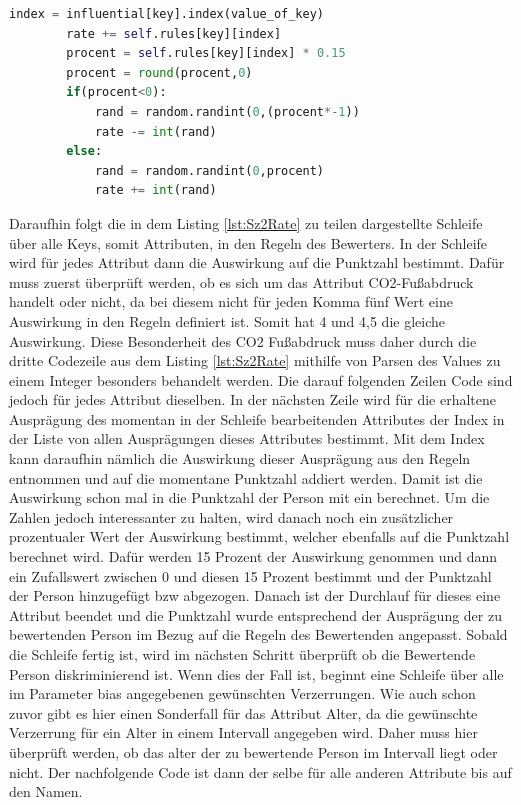 \begin{onehalfspace}
\begin{lstlisting}[language=Python,label={lst:Sz2Rate},caption=Codeausschnitt der Funktion zum Bewerten von Personen]
        index = influential[key].index(value_of_key)
        rate += self.rules[key][index]
        procent = self.rules[key][index] * 0.15
        procent = round(procent,0)
        if(procent<0):
            rand = random.randint(0,(procent*-1))
            rate -= int(rand)
        else:
            rand = random.randint(0,procent)
            rate += int(rand)
\end{lstlisting}
Daraufhin folgt die in dem Listing \ref{lst:Sz2Rate} zu teilen dargestellte Schleife über alle Keys, somit Attributen, in den Regeln des Bewerters. In der Schleife wird für jedes Attribut dann die Auswirkung auf die Punktzahl bestimmt. Dafür muss zuerst überprüft werden, ob es sich um das Attribut CO2-Fußabdruck handelt oder nicht, da bei diesem nicht für jeden Komma fünf Wert eine Auswirkung in den Regeln definiert ist. Somit hat 4 und 4,5 die gleiche Auswirkung. Diese Besonderheit des CO2 Fußabdruck muss daher durch die dritte Codezeile aus dem Listing \ref{lst:Sz2Rate} mithilfe von Parsen des Values zu einem Integer besonders behandelt werden. Die darauf folgenden Zeilen Code sind jedoch für jedes Attribut dieselben. In der nächsten Zeile wird für die erhaltene Ausprägung des momentan in der Schleife bearbeitenden Attributes der Index in der Liste von allen Ausprägungen dieses Attributes bestimmt. Mit dem Index kann daraufhin nämlich die Auswirkung dieser Ausprägung aus den Regeln entnommen und auf die momentane Punktzahl addiert werden. Damit ist die Auswirkung schon mal in die Punktzahl der Person mit ein berechnet. Um die Zahlen jedoch interessanter zu halten, wird danach noch ein zusätzlicher prozentualer Wert der Auswirkung bestimmt, welcher ebenfalls auf die Punktzahl berechnet wird. Dafür werden 15 Prozent der Auswirkung genommen und dann ein Zufallswert zwischen 0 und diesen 15 Prozent bestimmt und der Punktzahl der Person hinzugefügt \ac{bzw} abgezogen. Danach ist der Durchlauf für dieses eine Attribut beendet und die Punktzahl wurde entsprechend der Ausprägung der zu bewertenden Person im Bezug auf die Regeln des Bewertenden angepasst. Sobald die Schleife fertig ist, wird im nächsten Schritt überprüft ob die Bewertende Person diskriminierend ist. Wenn dies der Fall ist, beginnt eine Schleife über alle im Parameter \glqq{}bias\grqq{} angegebenen gewünschten Verzerrungen. Wie auch schon zuvor gibt es hier einen Sonderfall für das Attribut Alter, da die gewünschte Verzerrung für ein Alter in einem Intervall angegeben wird. Daher muss hier überprüft werden, ob das alter der zu bewertende Person im Intervall liegt oder nicht. Der nachfolgende Code ist dann der selbe für alle anderen Attribute bis auf den Namen.

\end{onehalfspace}
